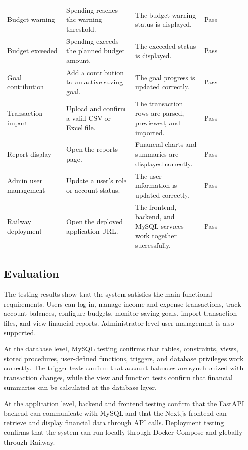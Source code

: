 \documentclass{article}
\begin{document}
\begin{longtable}{
    >{\raggedright\arraybackslash}p{0.24\linewidth}
    J{0.28\linewidth}
    J{0.28\linewidth}
    >{\centering\arraybackslash}p{0.10\linewidth}
}
Budget warning 
& Spending reaches the warning threshold. 
& The budget warning status is displayed. 
& Pass \\

Budget exceeded 
& Spending exceeds the planned budget amount. 
& The exceeded status is displayed. 
& Pass \\

Goal contribution 
& Add a contribution to an active saving goal. 
& The goal progress is updated correctly. 
& Pass \\

Transaction import 
& Upload and confirm a valid CSV or Excel file. 
& The transaction rows are parsed, previewed, and imported. 
& Pass \\

Report display 
& Open the reports page. 
& Financial charts and summaries are displayed correctly. 
& Pass \\

Admin user management 
& Update a user's role or account status. 
& The user information is updated correctly. 
& Pass \\

Railway deployment 
& Open the deployed application URL. 
& The frontend, backend, and MySQL services work together successfully. 
& Pass \\

\end{longtable}
\normalsize

\subsection{Evaluation}

The testing results show that the system satisfies the main functional requirements. Users can log in, manage income and expense transactions, track account balances, configure budgets, monitor saving goals, import transaction files, and view financial reports. Administrator-level user management is also supported.

At the database level, MySQL testing confirms that tables, constraints, views, stored procedures, user-defined functions, triggers, and database privileges work correctly. The trigger tests confirm that account balances are synchronized with transaction changes, while the view and function tests confirm that financial summaries can be calculated at the database layer.

At the application level, backend and frontend testing confirm that the FastAPI backend can communicate with MySQL and that the Next.js frontend can retrieve and display financial data through API calls. Deployment testing confirms that the system can run locally through Docker Compose and globally through Railway.
\end{document}
